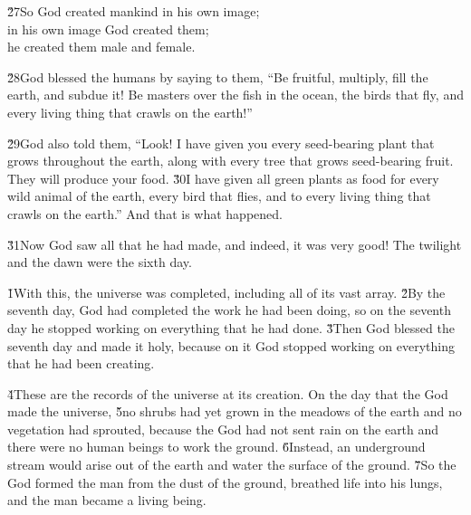 \begin{poetry}
\poeml \v{27}So God created mankind in his own image; \\
\poemll    in his own image God created them; \\
\poemlll       he created them male and female.
\end{poetry}

\v{28}God blessed the humans by saying to them, ``Be fruitful, multiply, fill the earth, and subdue it! Be masters over the fish in the ocean, the birds that fly, and every living thing that crawls on the earth!''

\v{29}God also told them, ``Look! I have given you every seed-bearing plant that grows throughout the earth, along with every tree that grows seed-bearing fruit. They will produce your food. \v{30}I have given all green plants as food for every wild animal of the earth, every bird that flies, and to every living thing that crawls on the earth.'' And that is what happened.

\v{31}Now God saw all that he had made, and indeed, it was very good! The twilight and the dawn were the sixth day.

\v{1}With this, the universe was completed, including all of its vast array. \v{2}By the seventh day, God had completed the work he had been doing, so on the seventh day he stopped working on everything that he had done. \v{3}Then God blessed the seventh day and made it holy, because on it God stopped working on everything that he had been creating.

\v{4}These are the records of the universe at its creation. On the day that the  God made the universe, \v{5}no shrubs had yet grown in the meadows of the earth and no vegetation had sprouted, because the  God had not sent rain on the earth and there were no human beings to work the ground. \v{6}Instead, an underground stream would arise out of the earth and water the surface of the ground. \v{7}So the  God formed the man from the dust of the ground, breathed life into his lungs, and the man became a living being.


